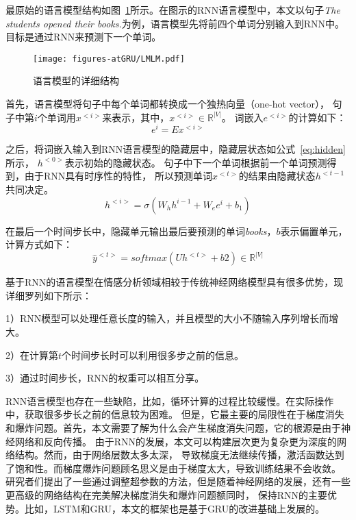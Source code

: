 最原始的语言模型结构如图~\ref{fig:LMLM}所示。在图示的RNN语言模型中，本文以句子\emph{The students opened their books.}为例，语言模型先将前四个单词分别输入到RNN中。
目标是通过RNN来预测下一个单词。

\begin{figure}[h!]
    \centering
    \texttt{[image: figures-atGRU/LMLM.pdf]}
    \caption{语言模型的详细结构}
    \label{fig:LMLM}
\end{figure}

首先，语言模型将句子中每个单词都转换成一个独热向量（one-hot vector），
句子中第${i}$个单词用${x^{<i>}}$来表示，其中，${x^{<i>} \in \mathbb{R}^{\left | V \right |}}$。
词嵌入${e^{<i>}}$的计算如下：
\begin{equation}
    e^{i}=Ex^{<i>}
\end{equation}

之后，将词嵌入输入到RNN语言模型的隐藏层中，隐藏层状态如公式~\ref{eq:hidden}所示，
${h^{<0>}}$表示初始的隐藏状态。
句子中下一个单词根据前一个单词预测得到，由于RNN具有时序性的特性，
所以预测单词${x^{<t>}}$的结果由隐藏状态${h^{<t-1}}$共同决定。
\begin{equation}
    h^{<i>}=\sigma \left ( W_{h}h^{i-1} +W_{e}e^{i}+b_{1}\right )
    \label{eq:hidden}
\end{equation}

在最后一个时间步长中，隐藏单元输出最后要预测的单词\emph{books}，${b}$表示偏置单元，计算方式如下：
\begin{equation}
    \widehat{y}^{<t>}=softmax\left (  Uh^{<t>}+b2\right ) \in \mathbb{R}^{\left | V \right |}
\end{equation}

基于RNN的语言模型在情感分析领域相较于传统神经网络模型具有很多优势，现详细罗列如下所示：

1）RNN模型可以处理任意长度的输入，并且模型的大小不随输入序列增长而增大。

2）在计算第${t}$个时间步长时可以利用很多步之前的信息。

3）通过时间步长，RNN的权重可以相互分享。

RNN语言模型也存在一些缺陷，比如，循环计算的过程比较缓慢。在实际操作中，获取很多步长之前的信息较为困难。
但是，它最主要的局限性在于梯度消失和爆炸问题。首先，本文需要了解为什么会产生梯度消失问题，它的根源是由于神经网络和反向传播。
由于RNN的发展，本文可以构建层次更为复杂更为深度的网络结构。然而，由于网络层数太多太深，
导致梯度无法继续传播，激活函数达到了饱和性。而梯度爆炸问题顾名思义是由于梯度太大，导致训练结果不会收敛。
研究者们提出了一些通过调整超参数的方法，但是随着神经网络的发展，还有一些更高级的网络结构在完美解决梯度消失和爆炸问题额同时，
保持RNN的主要优势。比如，LSTM和GRU，本文的框架也是基于GRU的改进基础上发展的。


